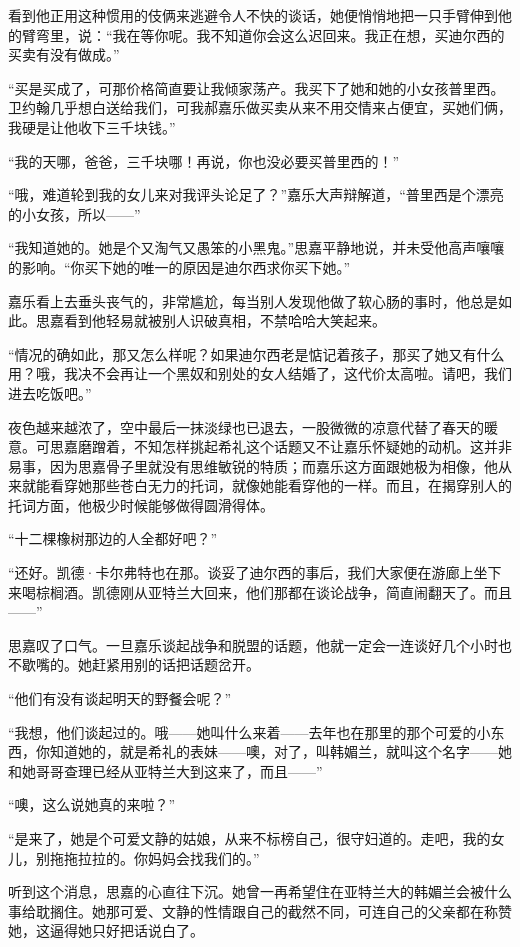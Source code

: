 \par 看到他正用这种惯用的伎俩来逃避令人不快的谈话，她便悄悄地把一只手臂伸到他的臂弯里，说：“我在等你呢。我不知道你会这么迟回来。我正在想，买迪尔西的买卖有没有做成。”
\par “买是买成了，可那价格简直要让我倾家荡产。我买下了她和她的小女孩普里西。卫约翰几乎想白送给我们，可我郝嘉乐做买卖从来不用交情来占便宜，买她们俩，我硬是让他收下三千块钱。”
\par “我的天哪，爸爸，三千块哪！再说，你也没必要买普里西的！”
\par “哦，难道轮到我的女儿来对我评头论足了？”嘉乐大声辩解道，“普里西是个漂亮的小女孩，所以——”
\par “我知道她的。她是个又淘气又愚笨的小黑鬼。”思嘉平静地说，并未受他高声嚷嚷的影响。“你买下她的唯一的原因是迪尔西求你买下她。”
\par 嘉乐看上去垂头丧气的，非常尴尬，每当别人发现他做了软心肠的事时，他总是如此。思嘉看到他轻易就被别人识破真相，不禁哈哈大笑起来。
\par “情况的确如此，那又怎么样呢？如果迪尔西老是惦记着孩子，那买了她又有什么用？哦，我决不会再让一个黑奴和别处的女人结婚了，这代价太高啦。请吧，我们进去吃饭吧。”
\par 夜色越来越浓了，空中最后一抹淡绿也已退去，一股微微的凉意代替了春天的暖意。可思嘉磨蹭着，不知怎样挑起希礼这个话题又不让嘉乐怀疑她的动机。这并非易事，因为思嘉骨子里就没有思维敏锐的特质；而嘉乐这方面跟她极为相像，他从来就能看穿她那些苍白无力的托词，就像她能看穿他的一样。而且，在揭穿别人的托词方面，他极少时候能够做得圆滑得体。
\par “十二棵橡树那边的人全都好吧？”
\par “还好。凯德·卡尔弗特也在那。谈妥了迪尔西的事后，我们大家便在游廊上坐下来喝棕榈酒。凯德刚从亚特兰大回来，他们那都在谈论战争，简直闹翻天了。而且——”
\par 思嘉叹了口气。一旦嘉乐谈起战争和脱盟的话题，他就一定会一连谈好几个小时也不歇嘴的。她赶紧用别的话把话题岔开。
\par “他们有没有谈起明天的野餐会呢？”
\par “我想，他们谈起过的。哦——她叫什么来着——去年也在那里的那个可爱的小东西，你知道她的，就是希礼的表妹——噢，对了，叫韩媚兰，就叫这个名字——她和她哥哥查理已经从亚特兰大到这来了，而且——”
\par “噢，这么说她真的来啦？”
\par “是来了，她是个可爱文静的姑娘，从来不标榜自己，很守妇道的。走吧，我的女儿，别拖拖拉拉的。你妈妈会找我们的。”
\par 听到这个消息，思嘉的心直往下沉。她曾一再希望住在亚特兰大的韩媚兰会被什么事给耽搁住。她那可爱、文静的性情跟自己的截然不同，可连自己的父亲都在称赞她，这逼得她只好把话说白了。
